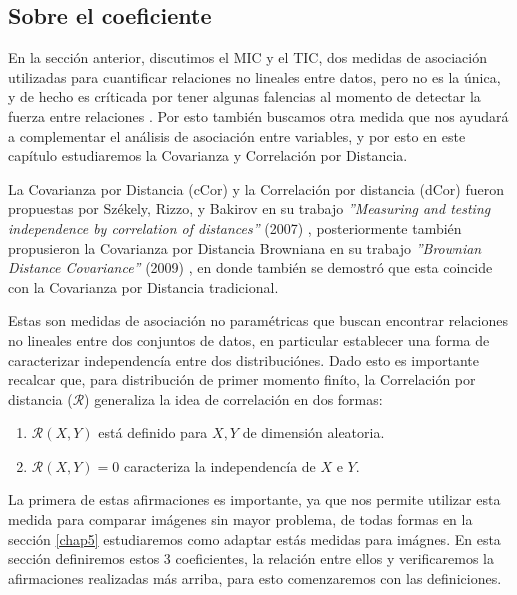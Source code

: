 \subsection{Sobre el coeficiente}

En la secci\'on anterior, discutimos el MIC y el TIC, dos medidas de asociaci\'on utilizadas para cuantificar relaciones no lineales entre datos, pero no es la \'unica, y de hecho es cr\'iticada por tener algunas falencias al momento de detectar la fuerza entre relaciones \cite{SimonTibshirani}. Por esto tambi\'en buscamos otra medida que nos ayudar\'a a complementar el an\'alisis de asociaci\'on entre variables, y por esto en este cap\'itulo estudiaremos la Covarianza y Correlaci\'on por Distancia.

La Covarianza por Distancia (cCor) y la Correlaci\'on por distancia (dCor) fueron propuestas por Sz\'ekely, Rizzo, y Bakirov en su trabajo \textit{''Measuring and testing independence by correlation of distances''} (2007) \cite{Szekely2007}, posteriormente tambi\'en propusieron la Covarianza por Distancia Browniana en su trabajo \textit{''Brownian Distance Covariance''} (2009) \cite{Szekely2009}, en donde tambi\'en se demostr\'o que esta coincide con la Covarianza por Distancia tradicional.

Estas son medidas de asociaci\'on no param\'etricas que buscan encontrar relaciones no lineales entre dos conjuntos de datos, en particular establecer una forma de caracterizar independenc\'ia entre dos distribuci\'ones. Dado esto es importante recalcar que, para distribuci\'on de primer momento fin\'ito, la Correlaci\'on por distancia ($\mathcal{R}$) generaliza la idea de correlaci\'on en dos formas:

\begin{enumerate}
	\item $\mathcal{R}(X,Y)$ est\'a definido para $X,Y$ de dimensi\'on aleatoria.
	\item $\mathcal{R}(X,Y) = 0$ caracteriza la independenc\'ia de $X$ e $Y$.	 
\end{enumerate}

La primera de estas afirmaciones es importante, ya que nos permite utilizar esta medida para comparar im\'agenes sin mayor problema, de todas formas en la secci\'on \ref{chap5} estudiaremos como adaptar est\'as medidas para im\'agnes. En esta secci\'on definiremos estos 3 coeficientes, la relaci\'on entre ellos y verificaremos la afirmaciones realizadas m\'as arriba, para esto comenzaremos con las definiciones. 

